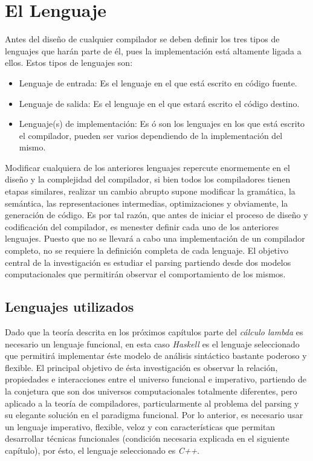 
\chapter{El Lenguaje}


Antes del diseño de cualquier compilador se deben definir los tres tipos de lenguajes que harán parte de él, pues la implementación está altamente ligada a ellos. Estos tipos de lenguajes son:

\begin{itemize}
	\item Lenguaje de entrada: Es el lenguaje en el que está escrito en código fuente.
	\item Lenguaje de salida: Es el lenguaje en el que estará escrito el código destino.
	\item Lenguaje(s) de implementación: Es ó son los lenguajes en los que está escrito el compilador, pueden ser varios dependiendo de la implementación del mismo.
\end{itemize}

Modificar cualquiera de los anteriores lenguajes repercute enormemente en el diseño y la complejidad del compilador, si bien todos los compiladores tienen etapas similares, realizar un cambio abrupto supone modificar la gramática, la semántica, las representaciones intermedias, optimizaciones y obviamente, la generación de código.
Es por tal razón, que antes de iniciar el proceso de diseño y codificación del compilador, es menester definir cada uno de los anteriores lenguajes. Puesto que no se llevará a cabo una implementación de un compilador completo, no se requiere la definición completa de cada lenguaje. El objetivo central de la investigación es estudiar el parsing partiendo desde dos modelos computacionales que permitirán observar el comportamiento de los mismos.


\section{Lenguajes utilizados}
Dado que la teoría descrita en los próximos capítulos parte del \emph{cálculo lambda} es necesario un lenguaje funcional, en esta caso \emph{Haskell} es el lenguaje seleccionado que permitirá implementar éste modelo de análisis sintáctico bastante poderoso y flexible. El principal objetivo de ésta investigación es observar la relación, propiedades e interacciones entre el universo funcional e imperativo, partiendo de la conjetura que son dos universos computacionales totalmente diferentes, pero aplicado a la teoría de compiladores, particularmente al problema del parsing y su elegante solución en el paradigma funcional. Por lo anterior, es necesario usar un lenguaje imperativo, flexible, veloz y con características que permitan desarrollar técnicas funcionales (condición necesaria explicada en el siguiente capítulo), por ésto, el lenguaje seleccionado es \emph{C++}.

